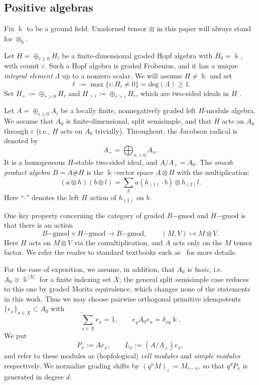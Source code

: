 \documentclass[11pt]{article}
\theoremstyle{definition}
\numberwithin{equation}{section}
\def\dgmod{\operatorname{-{gmod}}}
\newcommand{\kk}{\Bbbk}
\begin{document}
\subsection{Positive algebras}
Fix $\kk$ to be a ground field. Unadorned tensor $\otimes$ in this paper will always stand for $\otimes_\kk$.

Let
$H=\oplus_{i\ge 0}H_i$
be a finite-dimensional graded Hopf algebra with $H_0=\kk$, with counit $\varepsilon$. Such a Hopf algebra is graded Frobenius, and it has a unique \emph{integral element} $\Lambda$ up to a nonzero scalar.   We will assume $H\ne\kk$ and set
\begin{equation}\label{eq:ell}
\ell:=\max\{i:H_i\ne0\} = \mathrm{deg}(\Lambda) \ge 1.
\end{equation}
Set $H_{+}:=\oplus_{r>0}H_r$ and $H_{>i}:=\oplus_{r>i}H_r$, which are two-sided ideals in $H$ .

Let $A=\oplus_{i\ge0}A_i$
be a locally finite, nonnegatively graded left $H$-module algebra.  We assume that $A_0$ is finite-dimensional, split semisimple, and that $H$ acts on $A_0$ through $\varepsilon$ (i.e., $H$ acts on $A_0$ trivially).
Throughout, the Jacobson radical is denoted by
\begin{equation}\label{eq:positive-ideal}
A_+=\bigoplus_{n>0}A_n.
\end{equation}
It is a homogeneous $H$-stable two-sided ideal, and $A/A_+=A_0$.  The \emph{smash product algebra}
$B=A\#H$ is the $\Bbbk$-vector
space $A\otimes H$ with the multiplication:
\begin{equation}
(a\otimes h)(b\otimes l)=\sum_{h} a (h_{(1)}\cdot b)\otimes h_{(2)}l .
\end{equation}
Here ``$\cdot$'' denotes the left $H$ action of $h_{(1)}$ on $b$.

One key property concerning the category of graded $B\dgmod$ and $H\dgmod$ is that there is an action
\begin{equation}\label{eq:H-action}
    B\dgmod \times H\dgmod \to B\dgmod, \qquad (M,V)\mapsto M\otimes V.
\end{equation}
Here $H$ acts on $M\otimes V$ via the comultiplication, and $A$ acts only on the $M$ tensor factor.
We refer the reader to standard textbooks such as~\cite{Mo} for more details.


For the ease of exposition, we assume, in addition, that $A_0$ is \emph{basic}, i.e.\ $A_0\cong\kk^{\,|X|}$ for a finite indexing set $X$; the general split semisimple case reduces to this one by graded Morita equivalence, which changes none of the statements in this work.  Thus we may choose pairwise orthogonal primitive idempotents $\{e_x\}_{x\in X}\subset A_0$ with
\begin{equation}\label{eq:idempotents}
\sum_{x\in X}e_x=1,
\qquad
e_yA_0e_x=\delta_{xy}\kk .
\end{equation}
We put
\begin{equation}\label{eqn:cell}
P_x:=Ae_x,\qquad L_x:=(A/A_+)e_x ,
\end{equation}
and refer to these modules as (hopfological) \emph{cell modules} and \emph{simple modules} respectively.
We normalize grading shifts by $(q^nM)_i:=M_{i-n}$, so that $q^dP_x$ is generated in degree $d$. 
\end{document}
